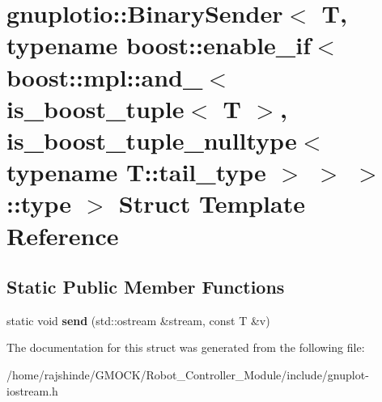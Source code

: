 \hypertarget{structgnuplotio_1_1_binary_sender_3_01_t_00_01typename_01boost_1_1enable__if_3_01boost_1_1mpl_1_29e1098ca8b7afc20f2ca0bc2e79506a}{}\section{gnuplotio\+:\+:Binary\+Sender$<$ T, typename boost\+:\+:enable\+\_\+if$<$ boost\+:\+:mpl\+:\+:and\+\_\+$<$ is\+\_\+boost\+\_\+tuple$<$ T $>$, is\+\_\+boost\+\_\+tuple\+\_\+nulltype$<$ typename T\+:\+:tail\+\_\+type $>$ $>$ $>$\+:\+:type $>$ Struct Template Reference}
\label{structgnuplotio_1_1_binary_sender_3_01_t_00_01typename_01boost_1_1enable__if_3_01boost_1_1mpl_1_29e1098ca8b7afc20f2ca0bc2e79506a}
\subsection*{Static Public Member Functions}
\begin{DoxyCompactItemize}
\item 
static void {\bfseries send} (std\+::ostream \&stream, const T \&v)\hypertarget{structgnuplotio_1_1_binary_sender_3_01_t_00_01typename_01boost_1_1enable__if_3_01boost_1_1mpl_1_29e1098ca8b7afc20f2ca0bc2e79506a_a50e54b7f2aba37f1f9e63fa81941b6d6}{}\label{structgnuplotio_1_1_binary_sender_3_01_t_00_01typename_01boost_1_1enable__if_3_01boost_1_1mpl_1_29e1098ca8b7afc20f2ca0bc2e79506a_a50e54b7f2aba37f1f9e63fa81941b6d6}

\end{DoxyCompactItemize}


The documentation for this struct was generated from the following file\+:\begin{DoxyCompactItemize}
\item 
/home/rajshinde/\+G\+M\+O\+C\+K/\+Robot\+\_\+\+Controller\+\_\+\+Module/include/gnuplot-\/iostream.\+h\end{DoxyCompactItemize}
